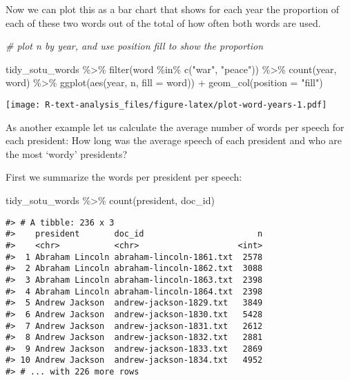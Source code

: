 \documentclass[
]{book}
\newenvironment{Shaded}{\begin{snugshade}}{\end{snugshade}}
\newcommand{\AttributeTok}[1]{\textcolor[rgb]{0.77,0.63,0.00}{#1}}
\newcommand{\CommentTok}[1]{\textcolor[rgb]{0.56,0.35,0.01}{\textit{#1}}}
\newcommand{\FunctionTok}[1]{\textcolor[rgb]{0.00,0.00,0.00}{#1}}
\newcommand{\NormalTok}[1]{#1}
\newcommand{\SpecialCharTok}[1]{\textcolor[rgb]{0.00,0.00,0.00}{#1}}
\newcommand{\StringTok}[1]{\textcolor[rgb]{0.31,0.60,0.02}{#1}}
\begin{document}
Now we can plot this as a bar chart that shows for each year the proportion of each of these two words out of the total of how often both words are used.

\begin{Shaded}
\begin{Highlighting}[]
\CommentTok{\# plot n by year, and use position \textquotesingle{}fill\textquotesingle{} to show the proportion}

\NormalTok{tidy\_sotu\_words }\SpecialCharTok{\%\textgreater{}\%}
  \FunctionTok{filter}\NormalTok{(word }\SpecialCharTok{\%in\%} \FunctionTok{c}\NormalTok{(}\StringTok{"war"}\NormalTok{, }\StringTok{"peace"}\NormalTok{)) }\SpecialCharTok{\%\textgreater{}\%} 
  \FunctionTok{count}\NormalTok{(year, word) }\SpecialCharTok{\%\textgreater{}\%} 
  \FunctionTok{ggplot}\NormalTok{(}\FunctionTok{aes}\NormalTok{(year, n, }\AttributeTok{fill =}\NormalTok{ word)) }\SpecialCharTok{+}
    \FunctionTok{geom\_col}\NormalTok{(}\AttributeTok{position =} \StringTok{"fill"}\NormalTok{)}
\end{Highlighting}
\end{Shaded}

\texttt{[image: R-text-analysis\_files/figure-latex/plot-word-years-1.pdf]}

As another example let us calculate the average number of words per speech for each president: How long was the average speech of each president and who are the most `wordy' presidents?

First we summarize the words per president per speech:

\begin{Shaded}
\begin{Highlighting}[]
\NormalTok{tidy\_sotu\_words }\SpecialCharTok{\%\textgreater{}\%}
  \FunctionTok{count}\NormalTok{(president, doc\_id)}
\end{Highlighting}
\end{Shaded}

\begin{verbatim}
#> # A tibble: 236 x 3
#>    president       doc_id                       n
#>    <chr>           <chr>                    <int>
#>  1 Abraham Lincoln abraham-lincoln-1861.txt  2578
#>  2 Abraham Lincoln abraham-lincoln-1862.txt  3088
#>  3 Abraham Lincoln abraham-lincoln-1863.txt  2398
#>  4 Abraham Lincoln abraham-lincoln-1864.txt  2398
#>  5 Andrew Jackson  andrew-jackson-1829.txt   3849
#>  6 Andrew Jackson  andrew-jackson-1830.txt   5428
#>  7 Andrew Jackson  andrew-jackson-1831.txt   2612
#>  8 Andrew Jackson  andrew-jackson-1832.txt   2881
#>  9 Andrew Jackson  andrew-jackson-1833.txt   2869
#> 10 Andrew Jackson  andrew-jackson-1834.txt   4952
#> # ... with 226 more rows
\end{verbatim}
\end{document}
